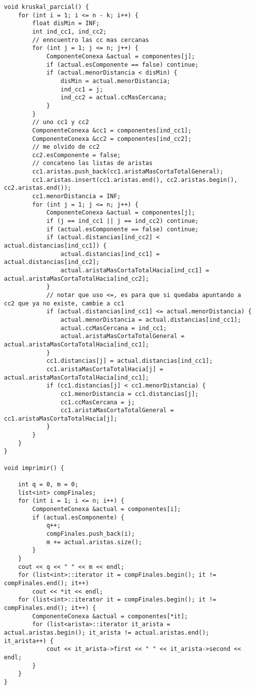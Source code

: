 \documentclass[11pt, a4paper, twoside]{article}
\begin{document}
\begin{lstlisting}
void kruskal_parcial() {
    for (int i = 1; i <= n - k; i++) {
        float disMin = INF;
        int ind_cc1, ind_cc2;
        // enncuentro las cc mas cercanas
        for (int j = 1; j <= n; j++) {
            ComponenteConexa &actual = componentes[j];
            if (actual.esComponente == false) continue;
            if (actual.menorDistancia < disMin) {
                disMin = actual.menorDistancia;
                ind_cc1 = j;
                ind_cc2 = actual.ccMasCercana;
            }
        }
        // uno cc1 y cc2
        ComponenteConexa &cc1 = componentes[ind_cc1];
        ComponenteConexa &cc2 = componentes[ind_cc2];
        // me olvido de cc2
        cc2.esComponente = false;
        // concateno las listas de aristas
        cc1.aristas.push_back(cc1.aristaMasCortaTotalGeneral);
        cc1.aristas.insert(cc1.aristas.end(), cc2.aristas.begin(), cc2.aristas.end());
        cc1.menorDistancia = INF;
        for (int j = 1; j <= n; j++) {
            ComponenteConexa &actual = componentes[j];
            if (j == ind_cc1 || j == ind_cc2) continue;
            if (actual.esComponente == false) continue;
            if (actual.distancias[ind_cc2] < actual.distancias[ind_cc1]) {
                actual.distancias[ind_cc1] = actual.distancias[ind_cc2];
                actual.aristaMasCortaTotalHacia[ind_cc1] = actual.aristaMasCortaTotalHacia[ind_cc2];
            }
            // notar que uso <=, es para que si quedaba apuntando a cc2 que ya no existe, cambie a cc1
            if (actual.distancias[ind_cc1] <= actual.menorDistancia) {
                actual.menorDistancia = actual.distancias[ind_cc1];
                actual.ccMasCercana = ind_cc1;
                actual.aristaMasCortaTotalGeneral = actual.aristaMasCortaTotalHacia[ind_cc1];
            }
            cc1.distancias[j] = actual.distancias[ind_cc1];
            cc1.aristaMasCortaTotalHacia[j] = actual.aristaMasCortaTotalHacia[ind_cc1];
            if (cc1.distancias[j] < cc1.menorDistancia) {
                cc1.menorDistancia = cc1.distancias[j];
                cc1.ccMasCercana = j;
                cc1.aristaMasCortaTotalGeneral = cc1.aristaMasCortaTotalHacia[j];
            }
        }
    }
}

void imprimir() {

    int q = 0, m = 0;
    list<int> compFinales;
    for (int i = 1; i <= n; i++) {
        ComponenteConexa &actual = componentes[i];
        if (actual.esComponente) {
            q++;
            compFinales.push_back(i);
            m += actual.aristas.size();
        }
    }
    cout << q << " " << m << endl;
    for (list<int>::iterator it = compFinales.begin(); it != compFinales.end(); it++)
        cout << *it << endl;
    for (list<int>::iterator it = compFinales.begin(); it != compFinales.end(); it++) {
        ComponenteConexa &actual = componentes[*it];
        for (list<arista>::iterator it_arista = actual.aristas.begin(); it_arista != actual.aristas.end(); it_arista++) {
            cout << it_arista->first << " " << it_arista->second << endl;
        }
    }
}
\end{lstlisting}
\clearpage
\end{document}
